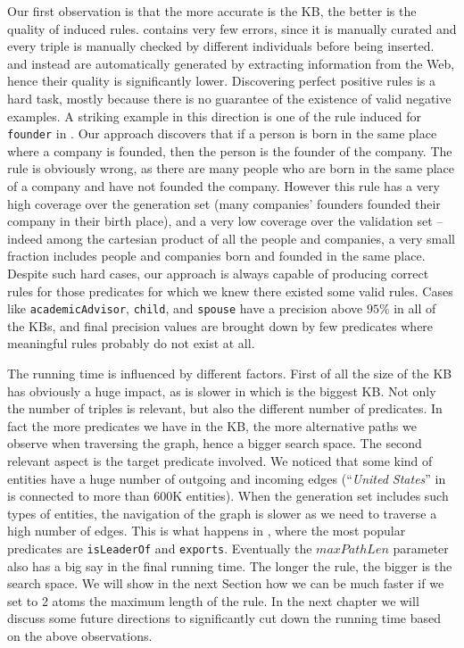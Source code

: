 Our first observation is that the more accurate is the KB, the better is the quality of induced rules. \wikidata contains very few errors, since it is manually curated and every triple is manually checked by different individuals before being inserted. \dbpedia and \yago instead are automatically generated by extracting information from the Web, hence their quality is significantly lower. Discovering perfect positive rules is a hard task, mostly because there is no guarantee of the existence of valid negative examples. A striking example in this direction is one of the rule induced for \texttt{founder} in \dbpedia. Our approach discovers that if a person is born in the same place where a company is founded, then the person is the founder of the company. The rule is obviously wrong, as there are many people who are born in the same place of a company and have not founded the company. However this rule has a very high coverage over the generation set (many companies' founders founded their company in their birth place), and a very low coverage over the validation set -- indeed among the cartesian product of all the people and companies, a very small fraction includes people and companies born and founded in the same place. Despite such hard cases, our approach is always capable of producing correct rules for those predicates for which we knew there existed some valid rules. 
Cases like \texttt{academicAdvisor}, \texttt{child}, and \texttt{spouse} have a precision above $95\%$ in all of the KBs, and final precision values are brought down by few predicates where meaningful rules probably do not exist at all.

The running time is influenced by different factors. First of all the size of the KB has obviously a huge impact, as \krd is slower in \wikidata which is the biggest KB. Not only the number of triples is relevant, but also the different number of predicates. In fact the more predicates we have in the KB, the more alternative paths we observe when traversing the graph, hence a bigger search space. The second relevant aspect is the target predicate involved. We noticed that some kind of entities have a huge number of outgoing and incoming edges (``\textit{United States}'' in \wikidata is connected to more than $600$K entities). When the generation set includes such types of entities, the navigation of the graph is slower as we need to traverse a high number of edges. This is what happens in \yago, where the most popular predicates are \texttt{isLeaderOf} and \texttt{exports}. Eventually the $maxPathLen$ parameter also has a big say in the final running time. The longer the rule, the bigger is the search space. We will show in the next Section how we can be much faster if we set to 2 atoms the maximum length of the rule. In the next chapter we will discuss some future directions to significantly cut down the running time based on the above observations.

